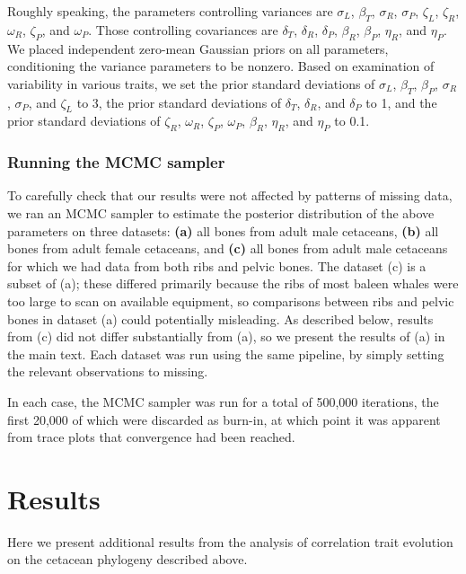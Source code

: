 \documentclass[12pt]{article}
\begin{document}
Roughly speaking, the parameters controlling variances are 
$\sigma_L$, $\beta_T$, $\sigma_R$, $\sigma_P$, $\zeta_L$, $\zeta_R$, $\omega_R$, $\zeta_P$, and $\omega_P$.
Those controlling covariances are $\delta_T$, $\delta_R$, $\delta_P$, $\beta_R$, $\beta_P$, $\eta_R$, and $\eta_P$.
We placed independent zero-mean Gaussian priors on all parameters, conditioning the variance parameters to be nonzero.
Based on examination of variability in various traits, we set
the prior standard deviations of $\sigma_L$, $\beta_T$, $\beta_P$, $\sigma_R$, $\sigma_P$, and $\zeta_L$ to 3,
the prior standard deviations of $\delta_T$, $\delta_R$, and $\delta_P$ to 1,
and the prior standard deviations of $\zeta_R$, $\omega_R$, $\zeta_P$, $\omega_P$, $\beta_R$, $\eta_R$, and $\eta_P$ to 0.1.



\subsubsection*{Running the MCMC sampler}

To carefully check that our results were not affected by patterns of missing data,
we ran an MCMC sampler to estimate the posterior distribution of the above parameters
on three datasets:
\textbf{(a)} all bones from adult male cetaceans,
\textbf{(b)} all bones from adult female cetaceans,
and \textbf{(c)} all bones from adult male cetaceans for which we had data from both ribs and pelvic bones.
The dataset (c) is a subset of (a);
these differed primarily because the ribs of most baleen whales were too large to scan on available equipment,
so comparisons between ribs and pelvic bones in dataset (a) could potentially misleading.
As described below, results from (c) did not differ substantially from (a),
so we present the results of (a) in the main text.
Each dataset was run using the same pipeline, 
by simply setting the relevant observations to missing.

In each case, the MCMC sampler was run for a total of 500,000 iterations,
the first 20,000 of which were discarded as burn-in,
at which point it was apparent from trace plots that convergence had been reached.


\section*{Results}

Here we present additional results from the analysis of correlation trait evolution on the cetacean phylogeny described above.
\end{document}
